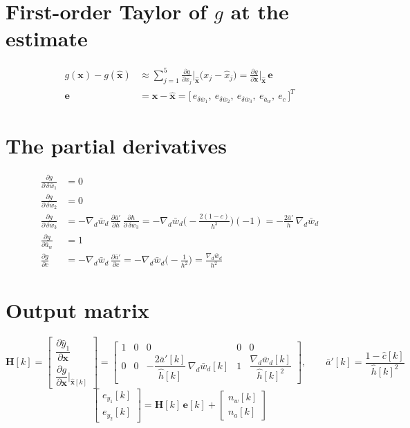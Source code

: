 \documentclass[11pt,a4paper]{ctexart}
\newcommand{\ba}{\bar{a}}
\newcommand{\bw}{\bar{w}}
\newcommand{\ap}{\ba'}
\newcommand{\hh}{\hat{h}}
\newcommand{\ch}{\hat{c}}
\begin{document}
\section{First-order Taylor of $g$ at the estimate}
\[
\begin{aligned}
g(\mathbf{x}) - g(\hat{\mathbf{x}}) &\approx \sum_{j=1}^{5} \frac{\partial g}{\partial x_j}\bigg|_{\hat{\mathbf{x}}} \big(x_j - \hat x_j\big)
= \frac{\partial g}{\partial \mathbf{x}}\bigg|_{\hat{\mathbf{x}}}\,\mathbf{e} \\
\mathbf{e} &= \mathbf{x} - \hat{\mathbf{x}} = \big[\,e_{\delta\bw_1},\ e_{\delta\bw_2},\ e_{\delta\bw_3},\ e_{\ba_w},\ e_c\,\big]^{T}
\end{aligned}
\]

\section{The partial derivatives}
\[
\begin{aligned}
\frac{\partial g}{\partial\,\delta\bw_1} &= 0 \\
\frac{\partial g}{\partial\,\delta\bw_2} &= 0 \\
\frac{\partial g}{\partial\,\delta\bw_3} &= -\nabla_d\bw_d\,\frac{\partial\ap}{\partial h}\,\frac{\partial h}{\partial\,\delta\bw_3}
 = -\nabla_d\bw_d\Big(-\frac{2(1-c)}{h^{3}}\Big)(-1) = -\frac{2\ap}{h}\,\nabla_d\bw_d \\
\frac{\partial g}{\partial\ba_w} &= 1 \\
\frac{\partial g}{\partial c} &= -\nabla_d\bw_d\,\frac{\partial\ap}{\partial c} = -\nabla_d\bw_d\Big(-\frac{1}{h^{2}}\Big) = \frac{\nabla_d\bw_d}{h^{2}}
\end{aligned}
\]

\section{Output matrix}
\[
\mathbf{H}[k] =
\begin{bmatrix} \dfrac{\partial \hat y_1}{\partial\mathbf{x}} \\[1.5ex] \dfrac{\partial g}{\partial\mathbf{x}}\Big|_{\hat{\mathbf{x}}[k]} \end{bmatrix}
=
\begin{bmatrix} 1 & 0 & 0 & 0 & 0 \\[0.5ex] 0 & 0 & -\dfrac{2\ap[k]}{\hh[k]}\,\nabla_d\bw_d[k] & 1 & \dfrac{\nabla_d\bw_d[k]}{\hh[k]^{2}} \end{bmatrix},
\qquad \ap[k] = \frac{1-\ch[k]}{\hh[k]^{2}}
\]
\[
\begin{bmatrix} e_{y_1}[k] \\ e_{y_2}[k] \end{bmatrix} = \mathbf{H}[k]\,\mathbf{e}[k] + \begin{bmatrix} n_w[k] \\ n_a[k] \end{bmatrix}
\]
\end{document}

